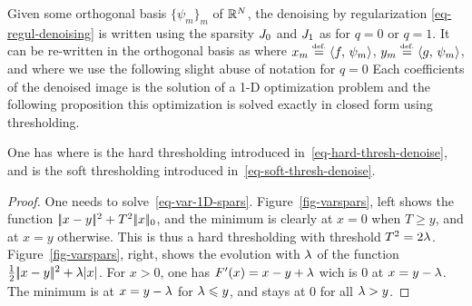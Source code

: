 Given some orthogonal basis $\{\psi_m\}_m$ of $\mathbb{R}^N$, the denoising by regularization \eqref{eq-regul-denoising} is written using the sparsity $J_{0}$ and $J_{1}$ as 
for $q=0$ or $q=1$. It can be re-written in the orthogonal basis as
where $x_m \stackrel{\mbox{\upshape\tiny def.}}{=} \langle f,\,\psi_m\rangle$, $y_m \stackrel{\mbox{\upshape\tiny def.}}{=} \langle g,\,\psi_m\rangle$, and where we use the following slight abuse of notation for $q=0$
Each coefficients of the denoised image is the solution of a 1-D optimization problem
and the following proposition this optimization is solved exactly in closed form using thresholding.

\begin{prop}\label{prop-equiv-sparse-thresh}
One has
where 
is the hard thresholding introduced in~\eqref{eq-hard-thresh-denoise}, and 
is the soft thresholding introduced in~\eqref{eq-soft-thresh-denoise}.
\end{prop}

	
\begin{proof}
	One needs to solve~\eqref{eq-var-1D-spars}. Figure~\ref{fig-varspars}, left shows the function $|\!| x-y |\!|^2+T^2 |\!| x |\!|_0$, and the minimum is clearly at $x=0$ when $T \geq y$, and at $x=y$ otherwise. This is thus a hard thresholding with threshold $T^2=2\lambda$. 
	Figure~\eqref{fig-varspars}, right, shows the evolution with $\lambda$ of the function $\frac{1}{2}|\!| x-y |\!|^2+\lambda |x|$. 
	For $x>0$, one has $F'(x)=x-y+\lambda$ wich is $0$ at $x=y-\lambda$.
	The minimum is at $x=y-\lambda$ for $\lambda \leqslant y$, and stays at $0$ for all $\lambda>y$. 
\end{proof}





